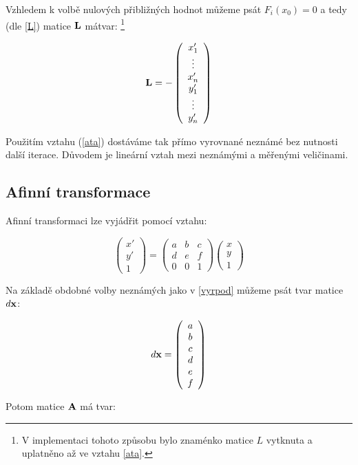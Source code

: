 Vzhledem k volbě nulových přibližných hodnot můžeme psát $F_i(x_0) = 0$ a tedy
(dle \ref{L}) matice ${\bf L}$ mátvar:
\footnote[1]{
V implementaci tohoto způsobu bylo znaménko matice $L$ vytknuta a uplatněno až
ve vztahu \ref{ata}.}

\begin{eqnarray}\label{podl}
{\bf L} = -\left(
\begin{array}{c}
x'_{1}\\
\vdots \\
x'_{n}\\
y'_{1}\\ 
\vdots \\
y'_{n}
\end{array}
\right) 
\end{eqnarray}


Použitím vztahu (\ref{ata}) dostáváme tak přímo vyrovnané neznámé bez nutnosti
další iterace. Důvodem je lineární vztah mezi neznámými a měřenými veličinami.

\subsection{Afinní transformace}
\label{vyraf}
Afinní transformaci lze vyjádřit pomocí vztahu:

$$\left(
\begin{array}{c}
x'\\
y'\\ 
1
\end{array}
\right) 
= 
\left(
\begin{array}{ccc}
a & b & c\\
d & e & f\\ 
0 & 0 & 1
\end{array}
\right) 
\left(
\begin{array}{c}
x\\
y\\ 
1
\end{array}
\right)
$$

Na základě obdobné volby neznámých jako v \ref{vyrpod}
můžeme psát tvar matice $d{\bf x}$:

$$ d{\bf x} =
\left(
\begin{array}{c}
a\\
b\\
c\\
d\\
e\\
f
\end{array}
\right) $$

Potom matice ${\bf A}$ má tvar:

